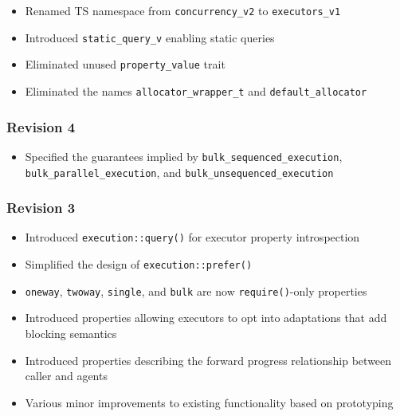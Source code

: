 \documentclass[a4paper,12pt,notitlepage,twoside,openright]{article}
\begin{document}
\begin{itemize}
  \begin{itemize}

  \item
    Renamed TS namespace from \texttt{concurrency_v2} to
    \texttt{executors_v1}
  \item
    Introduced \texttt{static_query_v} enabling static
    queries
  \item
    Eliminated unused \texttt{property_value} trait
  \item
    Eliminated the names \texttt{allocator_wrapper_t} and
    \texttt{default_allocator}
  \end{itemize}
\end{itemize}

\hypertarget{revision-4}{%
\subsubsection{Revision 4}\label{revision-4}}

\begin{itemize}

\item
  Specified the guarantees implied by
  \texttt{bulk_sequenced_execution},
  \texttt{bulk_parallel_execution}, and
  \texttt{bulk_unsequenced_execution}
\end{itemize}

\hypertarget{revision-3}{%
\subsubsection{Revision 3}\label{revision-3}}

\begin{itemize}

\item
  Introduced \texttt{execution::query()} for executor
  property introspection
\item
  Simplified the design of \texttt{execution::prefer()}
\item
  \texttt{oneway}, \texttt{twoway},
  \texttt{single}, and \texttt{bulk} are now
  \texttt{require()}-only properties
\item
  Introduced properties allowing executors to opt into adaptations that
  add blocking semantics
\item
  Introduced properties describing the forward progress relationship
  between caller and agents
\item
  Various minor improvements to existing functionality based on
  prototyping
\end{itemize}
\end{document}
